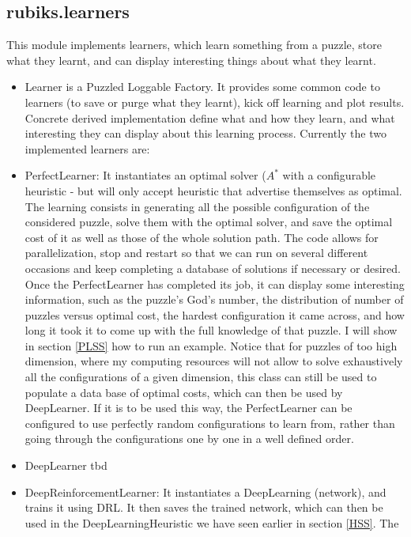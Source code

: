 \subsection{rubiks.learners}
\label{PLcode}
\label{DRLcode}
This module implements learners, which learn something from a puzzle, store what they learnt, and can display interesting things about what they learnt.

\begin{itemize}
\item Learner is a Puzzled Loggable Factory. It provides some common code to learners (to save or purge what they learnt), kick off learning and plot results. Concrete derived implementation define what and how they learn, and what interesting they can display about this learning process. Currently the two implemented learners are:
\item PerfectLearner: It instantiates an optimal solver ($A^{*}$ with a configurable heuristic - but will only accept heuristic that advertise themselves as optimal. The learning consists in generating all the possible configuration of the considered puzzle, solve them with the optimal solver, and save the optimal cost of it as well as those of the whole solution path. The code allows for parallelization, stop and restart so that we can run on several different occasions and keep completing a database of solutions if necessary or desired. Once the PerfectLearner has completed its job, it can display some interesting information, such as the puzzle's God's number, the distribution of number of puzzles versus optimal cost, the hardest configuration it came across, and how long it took it to come up with the full knowledge of that puzzle. I will show in section \ref{PLSS} how to run an example. Notice that for puzzles of too high dimension, where my computing resources will not allow to solve exhaustively all the configurations of a given dimension, this class can still be used to populate a data base of optimal costs, which can then be used by DeepLearner. If it is to be used this way, the PerfectLearner can be configured to use perfectly random configurations to learn from, rather than going through the configurations one by one in a well defined order.

\item DeepLearner tbd
\item DeepReinforcementLearner: It instantiates a DeepLearning (network), and trains it using DRL. It then saves the trained network, which can then be used in the DeepLearningHeuristic we have seen earlier in section \ref{HSS}. The


\end{itemize}


